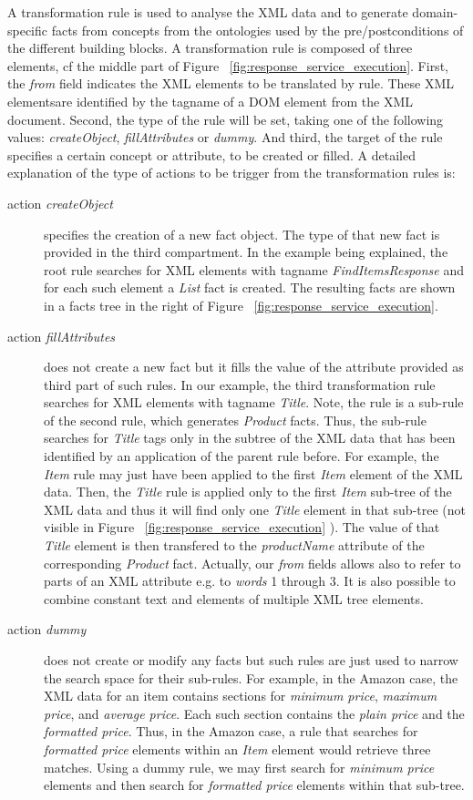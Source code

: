 \documentclass{fast_latex}
\begin{document}
A transformation rule is used to analyse the XML data and to generate domain-specific facts from concepts from the ontologies used by the pre/postconditions of the different building blocks. A transformation rule is composed of three elements, cf the middle part of Figure ~\ref{fig:response_service_execution}. First, the \textit{from} field indicates the XML elements to be translated by rule. These XML elementsare identified by the tagname of a DOM element from the XML document. Second, the type of the rule will be set, taking one of the following values: \emph{createObject}, \emph{fillAttributes} or \emph{dummy}. And third, the target of the rule specifies a certain concept or attribute, to be created or filled. A detailed explanation of the type of actions to be trigger from the transformation rules is:
\begin{description}
	\item[action \emph{createObject}] specifies the creation of a new fact object. The type of that new fact is provided in the third compartment. In the example being explained, the root rule searches for XML elements with tagname \emph{FindItemsResponse} and for each such element a \emph{List} fact is created. The resulting facts are shown in a facts tree in the right of Figure ~\ref{fig:response_service_execution}.
	\item[action \emph{fillAttributes}] does not create a new fact but it fills the value of the attribute provided as third part of such rules. In our example, the third transformation rule searches for XML elements with tagname \emph{Title}. Note, the rule is a sub-rule of the second rule, which generates \emph{Product} facts. Thus, the sub-rule searches for \emph{Title} tags only in the subtree of the XML data that has been identified by an application of the parent rule before. For example, the \emph{Item} rule may just have been applied to the first \emph{Item} element of the XML data. Then, the \emph{Title} rule is applied only to the first \emph{Item} sub-tree of the XML data and thus it will find only one \emph{Title} element in that sub-tree (not visible in Figure ~\ref{fig:response_service_execution} ). The value of that \emph{Title} element is then transfered to the \emph{productName} attribute of the corresponding \emph{Product} fact. Actually, our \textit{from} fields allows also to refer to parts of an XML attribute e.g. to \textit{words} 1 through 3. It is also possible to combine constant text and elements of multiple XML tree elements. 
	\item[action \emph{dummy}] does not create or modify any facts but such rules are just used to narrow the search space for their sub-rules. For example, in the Amazon case, the XML data for an item contains sections for \emph{minimum price}, \emph{maximum price}, and \emph{average price}. Each such section contains the \emph{plain price} and the \emph{formatted price}. Thus, in the Amazon case, a rule that searches for \emph{formatted price} elements within an \emph{Item} element would retrieve three matches. Using a dummy rule, we may first search for \emph{minimum price} elements and then search for \emph{formatted price} elements within that sub-tree.
\end{description}
\end{document}
